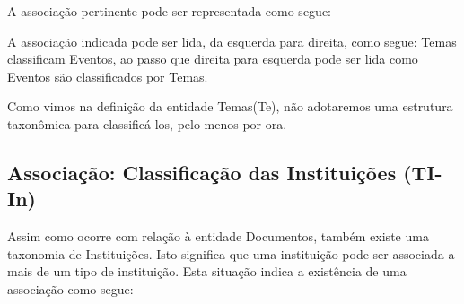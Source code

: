 \documentclass[
12pt,		%
openright,	%
twoside,  %
a4paper,			%
chapter=TITLE,		%
english,			%
french,				%
spanish,			%
brazil				%
]{USPSC-classe/USPSC}
\begin{document}
A associa\c{c}\~ao pertinente pode ser representada como segue:












A associa\c{c}\~ao indicada pode ser lida, da esquerda para direita, como segue: \textquotedbl Temas classificam Eventos\textquotedbl , ao passo que direita para  esquerda pode ser lida como \textquotedbl Eventos s\~ao classificados por Temas\textquotedbl .










Como vimos na defini\c{c}\~ao da entidade \textquotedbl Temas\textquotedbl  (Te), n\~ao adotaremos uma estrutura taxon\^omica para classific\'a-los, pelo menos por ora.










\subsection[Associa\c{c}\~ao: Classifica\c{c}\~ao das Institui\c{c}\~oes (TI-In)]{Associa\c{c}\~ao: Classifica\c{c}\~ao das Institui\c{c}\~oes (TI-In)}\label{Associa\c{c}\~ao: Classifica\c{c}\~ao das Institui\c{c}\~oes (TI-In)}
Assim como ocorre com rela\c{c}\~ao \`a entidade \textquotedbl Documentos\textquotedbl , tamb\'em existe uma taxonomia de \textquotedbl Institui\c{c}\~oes\textquotedbl . Isto significa que uma institui\c{c}\~ao pode ser associada a mais de um tipo de institui\c{c}\~ao. Esta situa\c{c}\~ao indica a exist\^encia de uma associa\c{c}\~ao como segue:
\end{document}

